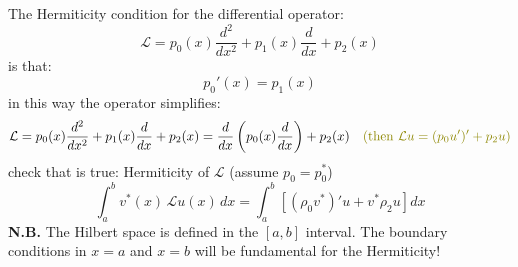 \documentclass{article}
\begin{document}
\noindent
The Hermiticity condition for the differential operator:
\begin{equation}
    \mathcal{L} = p_0(x) \frac{d^2}{dx^2} + p_1(x) \frac{d}{dx} + p_2(x)
\end{equation}
is that:
\begin{equation}
    p_0' (x) = p_1 (x)
\end{equation}
in this way the operator simplifies:
\begin{equation}
    \mathcal{L} = p_0(x) \frac{d^2}{dx^2} + p_1(x) \frac{d}{dx} + p_2(x) = \frac{d}{dx}\left( p_0 (x) \frac{d}{dx} \right) + p_2 (x) \quad \color{olive} (\text{then } \mathcal{L}u = (p_0 u')' + p_2u) \color{black}
\end{equation}
check that is true: Hermiticity of $\mathcal{L}$ (assume $p_0 = p_0 ^*$)
\begin{equation}
    \int_a^b v^*(x)\, \mathcal{L}u(x)\, dx
= \int_a^b \left[ (\rho_0 v^*)' u + v^* \rho_2 u \right] dx
\end{equation}
\textbf{N.B. }The Hilbert space is defined in the $[a,b]$ interval. The boundary conditions in $x=a$ and $x=b$ will be fundamental for the Hermiticity!
\end{document}
